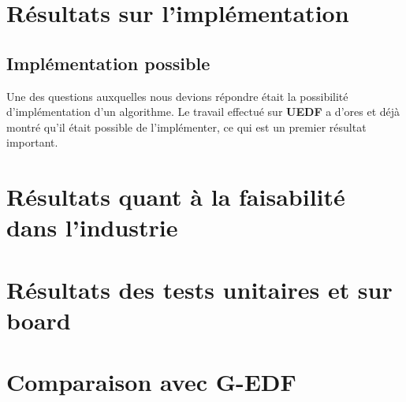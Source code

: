 
\section{Résultats sur l'implémentation}
	\subsection{Implémentation possible}
	
	Une des questions auxquelles nous devions répondre était la possibilité d'implémentation d'un algorithme.
	Le travail effectué sur \textbf{UEDF} a d'ores et déjà montré qu'il était possible de l'implémenter, ce qui 
	est un premier résultat important.\newline
	
	
	

\section{Résultats quant à la faisabilité dans l'industrie}

\section{Résultats des tests unitaires et sur board}

\section{Comparaison avec G-EDF}

